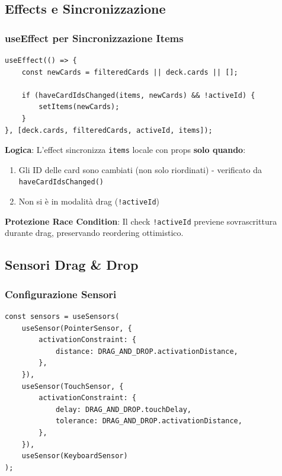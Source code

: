 \documentclass[11pt,a4paper]{article}
\begin{document}
\subsection{Effects e Sincronizzazione}

\subsubsection{useEffect per Sincronizzazione Items}

\begin{lstlisting}[style=typescript, caption=Sincronizzazione State]
useEffect(() => {
    const newCards = filteredCards || deck.cards || [];
    
    if (haveCardIdsChanged(items, newCards) && !activeId) {
        setItems(newCards);
    }
}, [deck.cards, filteredCards, activeId, items]);
\end{lstlisting}

\textbf{Logica}: L'effect sincronizza \texttt{items} locale con props \textbf{solo quando}:
\begin{enumerate}
    \item Gli ID delle card sono cambiati (non solo riordinati) - verificato da \texttt{haveCardIdsChanged()}
    \item Non si è in modalità drag (\texttt{!activeId})
\end{enumerate}

\textbf{Protezione Race Condition}: Il check \texttt{!activeId} previene sovrascrittura durante drag, preservando reordering ottimistico.

\subsection{Sensori Drag \& Drop}

\subsubsection{Configurazione Sensori}

\begin{lstlisting}[style=typescript, caption=Configurazione Sensori]
const sensors = useSensors(
    useSensor(PointerSensor, {
        activationConstraint: {
            distance: DRAG_AND_DROP.activationDistance,
        },
    }),
    useSensor(TouchSensor, {
        activationConstraint: {
            delay: DRAG_AND_DROP.touchDelay,
            tolerance: DRAG_AND_DROP.activationDistance,
        },
    }),
    useSensor(KeyboardSensor)
);
\end{lstlisting}
\end{document}
